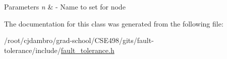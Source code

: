\begin{DoxyParams}{Parameters}
{\em n} & -\/ Name to set for node \\
\hline
\end{DoxyParams}


The documentation for this class was generated from the following file\-:\begin{DoxyCompactItemize}
\item 
/root/cjdambro/grad-\/school/\-C\-S\-E498/gits/fault-\/tolerance/include/\hyperlink{fault__tolerance_8h}{fault\-\_\-tolerance.\-h}\end{DoxyCompactItemize}

